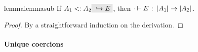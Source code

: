 \begin{restatable}{lemma}{lemmasub}
  \label{lemma:sub}
  If $ A_1 \subtype A_2 \yields E $, then $ \cdot \vdash E \ \!:\! \ \lvert A_1 \rvert \to \lvert A_2 \rvert $.
\end{restatable}

\begin{proof}
  By a straightforward induction on the derivation.
\end{proof}




\paragraph{Unique coercions}

%
%
%
%
%

